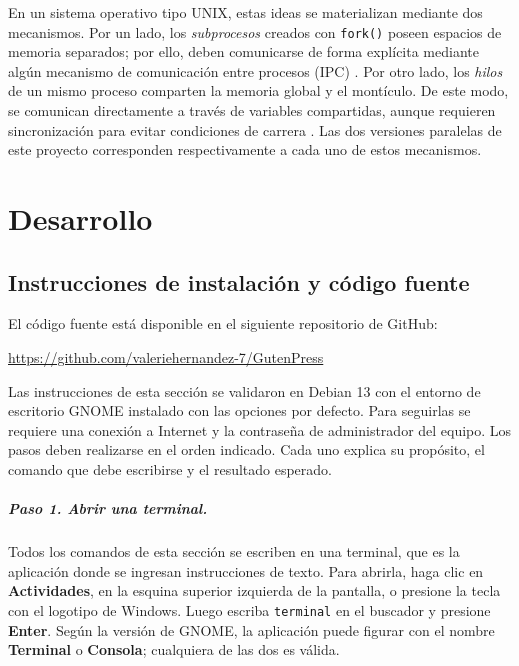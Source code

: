 \documentclass{report}
\begin{document}
En un sistema operativo tipo UNIX, estas ideas se materializan mediante dos mecanismos. Por un lado, los \emph{subprocesos} creados con \texttt{fork()} poseen espacios de memoria separados; por ello, deben comunicarse de forma explícita mediante algún mecanismo de comunicación entre procesos (IPC) \cite{kerrisk10}. Por otro lado, los \emph{hilos} de un mismo proceso comparten la memoria global y el montículo. De este modo, se comunican directamente a través de variables compartidas, aunque requieren sincronización para evitar condiciones de carrera \cite{manpthreads}. Las dos versiones paralelas de este proyecto corresponden respectivamente a cada uno de estos mecanismos.

\chapter{Desarrollo}\label{desarrollo}

\section{Instrucciones de instalación y código fuente}\label{instalacion}

El código fuente está disponible en el siguiente repositorio de GitHub:

\begin{center}
    \url{https://github.com/valeriehernandez-7/GutenPress}
\end{center}

Las instrucciones de esta sección se validaron en Debian 13 con el entorno de escritorio GNOME instalado con las opciones por defecto. Para seguirlas se requiere una conexión a Internet y la contraseña de administrador del equipo. Los pasos deben realizarse en el orden indicado. Cada uno explica su propósito, el comando que debe escribirse y el resultado esperado.

\paragraph{Paso 1. Abrir una terminal.} Todos los comandos de esta sección se escriben en una terminal, que es la aplicación donde se ingresan instrucciones de texto. Para abrirla, haga clic en \textbf{Actividades}, en la esquina superior izquierda de la pantalla, o presione la tecla con el logotipo de Windows. Luego escriba \texttt{terminal} en el buscador y presione \textbf{Enter}. Según la versión de GNOME, la aplicación puede figurar con el nombre \textbf{Terminal} o \textbf{Consola}; cualquiera de las dos es válida.
\end{document}
